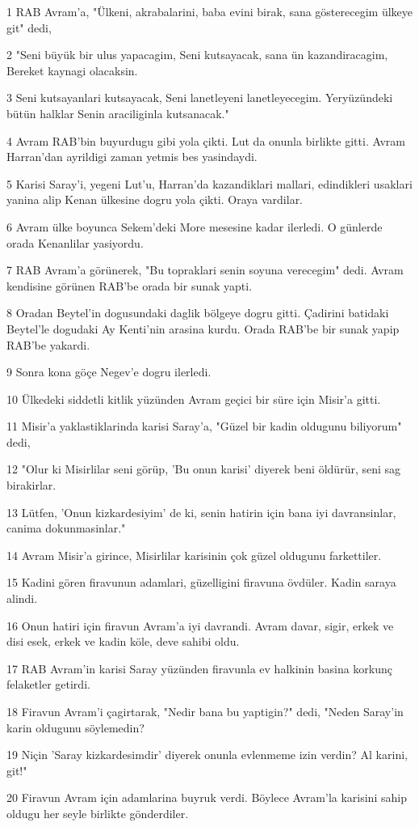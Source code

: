 \par 1 RAB Avram'a, "Ülkeni, akrabalarini, baba evini birak, sana gösterecegim ülkeye git" dedi,
\par 2 "Seni büyük bir ulus yapacagim, Seni kutsayacak, sana ün kazandiracagim, Bereket kaynagi olacaksin.
\par 3 Seni kutsayanlari kutsayacak, Seni lanetleyeni lanetleyecegim. Yeryüzündeki bütün halklar Senin araciliginla kutsanacak."
\par 4 Avram RAB'bin buyurdugu gibi yola çikti. Lut da onunla birlikte gitti. Avram Harran'dan ayrildigi zaman yetmis bes yasindaydi.
\par 5 Karisi Saray'i, yegeni Lut'u, Harran'da kazandiklari mallari, edindikleri usaklari yanina alip Kenan ülkesine dogru yola çikti. Oraya vardilar.
\par 6 Avram ülke boyunca Sekem'deki More mesesine kadar ilerledi. O günlerde orada Kenanlilar yasiyordu.
\par 7 RAB Avram'a görünerek, "Bu topraklari senin soyuna verecegim" dedi. Avram kendisine görünen RAB'be orada bir sunak yapti.
\par 8 Oradan Beytel'in dogusundaki daglik bölgeye dogru gitti. Çadirini batidaki Beytel'le dogudaki Ay Kenti'nin arasina kurdu. Orada RAB'be bir sunak yapip RAB'be yakardi.
\par 9 Sonra kona göçe Negev'e dogru ilerledi.
\par 10 Ülkedeki siddetli kitlik yüzünden Avram geçici bir süre için Misir'a gitti.
\par 11 Misir'a yaklastiklarinda karisi Saray'a, "Güzel bir kadin oldugunu biliyorum" dedi,
\par 12 "Olur ki Misirlilar seni görüp, 'Bu onun karisi' diyerek beni öldürür, seni sag birakirlar.
\par 13 Lütfen, 'Onun kizkardesiyim' de ki, senin hatirin için bana iyi davransinlar, canima dokunmasinlar."
\par 14 Avram Misir'a girince, Misirlilar karisinin çok güzel oldugunu farkettiler.
\par 15 Kadini gören firavunun adamlari, güzelligini firavuna övdüler. Kadin saraya alindi.
\par 16 Onun hatiri için firavun Avram'a iyi davrandi. Avram davar, sigir, erkek ve disi esek, erkek ve kadin köle, deve sahibi oldu.
\par 17 RAB Avram'in karisi Saray yüzünden firavunla ev halkinin basina korkunç felaketler getirdi.
\par 18 Firavun Avram'i çagirtarak, "Nedir bana bu yaptigin?" dedi, "Neden Saray'in karin oldugunu söylemedin?
\par 19 Niçin 'Saray kizkardesimdir' diyerek onunla evlenmeme izin verdin? Al karini, git!"
\par 20 Firavun Avram için adamlarina buyruk verdi. Böylece Avram'la karisini sahip oldugu her seyle birlikte gönderdiler.

